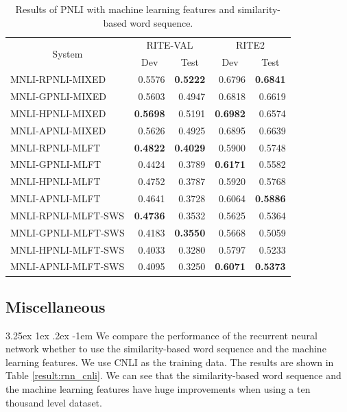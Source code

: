 \documentclass[12pt]{article}
\makeatletter
\renewcommand\paragraph{\@startsection{paragraph}{5}{\z@}%
  {3.25ex \@plus1ex \@minus.2ex}%
  {-1em}%
  {\normalfont\normalsize\bfseries}}
\makeatother
\begin{document}
\begin{CJK*}{UTF8}{bkai}
\begin{spacing}{1.77}
\begin{table}[H]
  \centering
  \setlength{\extrarowheight}{-3pt}
  \caption{Results of PNLI with machine learning features and similarity-based word sequence.}
  \label{tab:pnli_mlft_sws}
  \begin{tabular}{|l|r|r|r|r|}
  \hline
  \multicolumn{1}{|c|}{\multirow{2}{*}{System}} & \multicolumn{2}{c|}{RITE-VAL} & \multicolumn{2}{c|}{RITE2} \\ \cline{2-5}
  \multicolumn{1}{|c|}{} & \multicolumn{1}{c|}{Dev} & \multicolumn{1}{c|}{Test} & \multicolumn{1}{c|}{Dev} & \multicolumn{1}{c|}{Test} \\ \hline
  MNLI-RPNLI-MIXED & 0.5576 & \textbf{0.5222} & 0.6796 & \textbf{0.6841} \\ \hline
  MNLI-GPNLI-MIXED & 0.5603 & 0.4947 & 0.6818 & 0.6619 \\ \hline
  MNLI-HPNLI-MIXED & \textbf{0.5698} & 0.5191 & \textbf{0.6982} & 0.6574 \\ \hline
  MNLI-APNLI-MIXED & 0.5626 & 0.4925 & 0.6895 & 0.6639 \\ \hline \hline
  MNLI-RPNLI-MLFT & \textbf{0.4822} & \textbf{0.4029} & 0.5900 & 0.5748 \\ \hline
  MNLI-GPNLI-MLFT & 0.4424 & 0.3789 & \textbf{0.6171} & 0.5582 \\ \hline
  MNLI-HPNLI-MLFT & 0.4752 & 0.3787 & 0.5920 & 0.5768 \\ \hline
  MNLI-APNLI-MLFT & 0.4641 & 0.3728 & 0.6064 & \textbf{0.5886} \\ \hline \hline
  MNLI-RPNLI-MLFT-SWS & \textbf{0.4736} & 0.3532 & 0.5625 & 0.5364 \\ \hline
  MNLI-GPNLI-MLFT-SWS & 0.4183 & \textbf{0.3550} & 0.5668 & 0.5059 \\ \hline
  MNLI-HPNLI-MLFT-SWS & 0.4033 & 0.3280 & 0.5797 & 0.5233 \\ \hline
  MNLI-APNLI-MLFT-SWS & 0.4095 & 0.3250 & \textbf{0.6071} & \textbf{0.5373} \\ \hline
  \end{tabular}
\end{table}

\subsection{Miscellaneous}
\paragraph{}
We compare the performance of the recurrent neural network whether to use the similarity-based word sequence and the machine learning features. We use CNLI as the training data. The results are shown in Table \ref{result:rnn_cnli}. We can see that the similarity-based word sequence and the machine learning features have huge improvements when using a ten thousand level dataset.


\end{spacing}
\end{CJK*}
\end{document}

